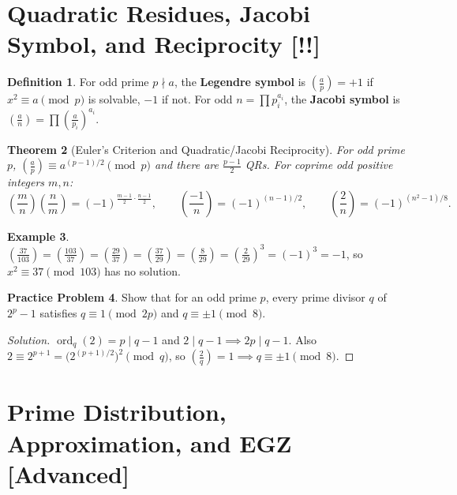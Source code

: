 \documentclass[11pt]{article}
\theoremstyle{plain}
\newtheorem{theorem}{Theorem}[section]
\theoremstyle{definition}
\newtheorem{definition}[theorem]{Definition}
\newtheorem{example}[theorem]{Example}
\newtheorem{problem}[theorem]{Practice Problem}
\newenvironment{solution}{\begin{proof}[Solution]}{\end{proof}}
\newcommand{\ord}{\operatorname{ord}}
\begin{document}
\section{Quadratic Residues, Jacobi Symbol, and Reciprocity [!!]}

\begin{definition}
For odd prime $p \nmid a$, the \textbf{Legendre symbol} is $\left(\frac{a}{p}\right) = +1$ if $x^2 \equiv a \pmod p$ is solvable, $-1$ if not. For odd $n = \prod p_i^{a_i}$, the \textbf{Jacobi symbol} is $\left(\frac{a}{n}\right) = \prod \left(\frac{a}{p_i}\right)^{a_i}$.
\end{definition}

\begin{theorem}[Euler's Criterion and Quadratic/Jacobi Reciprocity]
For odd prime $p$, $\left(\frac{a}{p}\right) \equiv a^{(p-1)/2} \pmod p$ and there are $\frac{p-1}{2}$ QRs. For coprime odd positive integers $m, n$:
\[
\left(\frac{m}{n}\right)\left(\frac{n}{m}\right) = (-1)^{\frac{m-1}{2}\cdot\frac{n-1}{2}}, \qquad
\left(\frac{-1}{n}\right) = (-1)^{(n-1)/2}, \qquad
\left(\frac{2}{n}\right) = (-1)^{(n^2-1)/8}.
\]
\end{theorem}

\begin{example}
$\left(\frac{37}{103}\right) = \left(\frac{103}{37}\right) = \left(\frac{29}{37}\right) = \left(\frac{37}{29}\right) = \left(\frac{8}{29}\right) = \left(\frac{2}{29}\right)^3 = (-1)^3 = -1$, so $x^2 \equiv 37 \pmod{103}$ has no solution.
\end{example}

\begin{problem}
Show that for an odd prime $p$, every prime divisor $q$ of $2^p - 1$
satisfies $q \equiv 1 \pmod{2p}$ and $q \equiv \pm 1 \pmod 8$.
\end{problem}
\begin{solution}
$\ord_q(2) = p \mid q-1$ and $2 \mid q-1 \implies 2p \mid q-1$. Also $2 \equiv 2^{p+1} = \bigl(2^{(p+1)/2}\bigr)^2 \pmod q$, so $\left(\frac{2}{q}\right) = 1 \implies q \equiv \pm 1 \pmod 8$.
\end{solution}

\section{Prime Distribution, Approximation, and EGZ [Advanced]}
\end{document}
